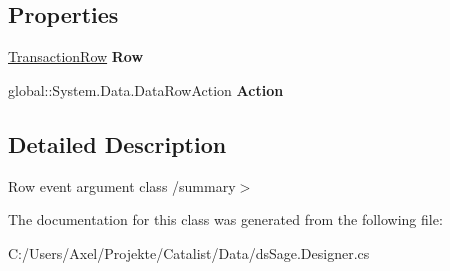 \subsection*{Properties}
\begin{DoxyCompactItemize}
\item 
\hyperlink{class_products_1_1_data_1_1ds_sage_1_1_transaction_row}{Transaction\+Row} {\bfseries Row}\hypertarget{class_products_1_1_data_1_1ds_sage_1_1_transaction_row_change_event_a625761446d652d842ba6e1ad51cd48c9}{}\label{class_products_1_1_data_1_1ds_sage_1_1_transaction_row_change_event_a625761446d652d842ba6e1ad51cd48c9}

\item 
global\+::\+System.\+Data.\+Data\+Row\+Action {\bfseries Action}\hypertarget{class_products_1_1_data_1_1ds_sage_1_1_transaction_row_change_event_a75d4d77ff5e2f56b7bec5183a535fe7d}{}\label{class_products_1_1_data_1_1ds_sage_1_1_transaction_row_change_event_a75d4d77ff5e2f56b7bec5183a535fe7d}

\end{DoxyCompactItemize}


\subsection{Detailed Description}
Row event argument class /summary$>$ 

The documentation for this class was generated from the following file\+:\begin{DoxyCompactItemize}
\item 
C\+:/\+Users/\+Axel/\+Projekte/\+Catalist/\+Data/ds\+Sage.\+Designer.\+cs\end{DoxyCompactItemize}
